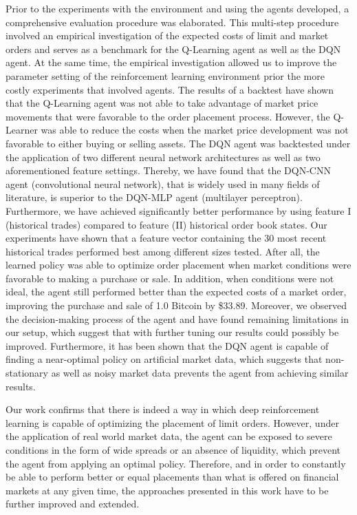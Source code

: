 Prior to the experiments with the environment and using the agents developed, a comprehensive evaluation procedure was elaborated.
This multi-step procedure involved an empirical investigation of the expected costs of limit and market orders and serves as a benchmark for the Q-Learning agent as well as the DQN agent.
At the same time, the empirical investigation allowed us to improve the parameter setting of the reinforcement learning environment prior the more costly experiments that involved agents.
The results of a backtest have shown that the Q-Learning agent was not able to take advantage of market price movements that were favorable to the order placement process.
However, the Q-Learner was able to reduce the costs when the market price development was not favorable to either buying or selling assets.
The DQN agent was backtested under the application of two different neural network architectures as well as two aforementioned feature settings.
Thereby, we have found that the DQN-CNN agent (convolutional neural network), that is widely used in many fields of literature, is superior to the DQN-MLP agent (multilayer perceptron).
Furthermore, we have achieved significantly better performance by using feature I (historical trades) compared to feature (II) historical order book states.
Our experiments have shown that a feature vector containing the 30 most recent historical trades performed best among different sizes tested.
After all, the learned policy was able to optimize order placement when market conditions were favorable to making a purchase or sale.
In addition, when conditions were not ideal, the agent still performed better than the expected costs of a market order, improving the purchase and sale of 1.0 Bitcoin by \$33.89.
Moreover, we observed the decision-making process of the agent and have found remaining limitations in our setup, which suggest that with further tuning our results could possibly be improved.
Furthermore, it has been shown that the DQN agent is capable of finding a near-optimal policy on artificial market data, which suggests that non-stationary as well as noisy market data prevents the agent from achieving similar results.

Our work confirms that there is indeed a way in which deep reinforcement learning is capable of optimizing the placement of limit orders.
However, under the application of real world market data, the agent can be exposed to severe conditions in the form of wide spreads or an absence of liquidity, which prevent the agent from applying an optimal policy.
Therefore, and in order to constantly be able to perform better or equal placements than what is offered on financial markets at any given time, the approaches presented in this work have to be further improved and extended.

